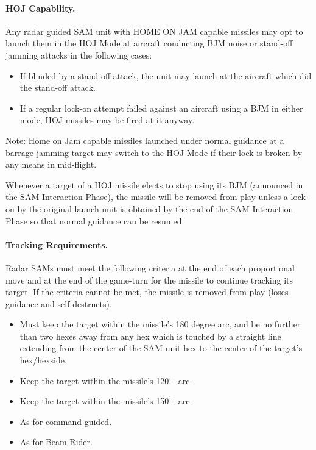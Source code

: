 \paragraph{HOJ Capability.} Any radar guided SAM unit with HOME ON JAM capable missiles may opt to launch them in the HOJ Mode at aircraft conducting BJM noise or stand-off jamming attacks in the following cases:

\begin{itemize}

    \item If blinded by a stand-off attack, the unit may launch at the aircraft which did the stand-off attack.

    \item If a regular lock-on attempt failed against an aircraft using a BJM in either mode, HOJ missiles may be fired at it anyway.

\end{itemize}

Note: Home on Jam capable missiles launched under normal guidance at a barrage jamming target may switch to the HOJ Mode if their lock is broken by any means in mid-flight.

Whenever a target of a HOJ missile elects to stop using its BJM (announced in the SAM Interaction Phase), the missile will be removed from play unless a lock-on by the original launch unit is obtained by the end of the SAM Interaction Phase so that normal guidance can be resumed.

\paragraph{Tracking Requirements.} Radar SAMs must meet the following criteria at the end of each proportional move and at the end of the game-turn for the missile to continue tracking its target. If the criteria cannot be met, the missile is removed from play (loses guidance and self-destructs).

\begin{itemize}
    \item{} Must keep the target within the missile's 180 degree arc, and be no further than two hexes away from any hex which is touched by a straight line extending from the center of the SAM unit hex to the center of the target's hex/hexside.

    \item{} Keep the target within the missile's 120+ arc.

    \item{} Keep the target within the missile's 150+ arc.

    \item{} As for command guided.

    \item{} As for Beam Rider.
\end{itemize}

